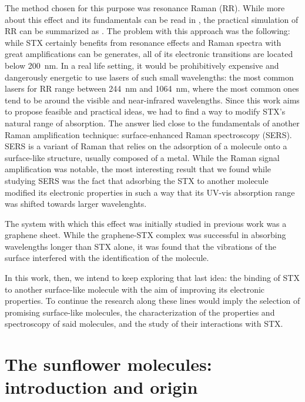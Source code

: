 The method chosen for this purpose was resonance Raman (RR).
While more about this effect and its fundamentals can be read in , the practical simulation of RR can be summarized as .
The problem with this approach was the following: while STX certainly benefits from resonance effects and Raman spectra with great amplifications can be generates, all of its electronic transitions are located below \SI{200}{\nano\metre}.
In a real life setting, it would be prohibitively expensive and dangerously energetic to use lasers of such small wavelengths: the most common lasers for RR range between \SI{244}{\nano\metre} and \SI{1064}{\nano\metre}, where the most common ones tend to be around the visible and near-infrared wavelengths.\cite{karlsson18,horiba}
Since this work aims to propose feasible and practical ideas, we had to find a way to modify STX's natural range of absorption.
The answer lied close to the fundamentals of another Raman amplification technique: surface-enhanced Raman spectroscopy (SERS).
SERS is a variant of Raman that relies on the adsorption of a molecule onto a surface-like structure, usually composed of a metal.
While the Raman signal amplification was notable, the most interesting result that we found while studying SERS was the fact that adsorbing the STX to another molecule modified its electronic properties in such a way that its UV-vis absorption range was shifted towards larger wavelenghts.

The system with which this effect was initially studied in previous work was a graphene sheet.
While the graphene-STX complex was successful in absorbing wavelengths longer than STX alone, it was found that the vibrations of the surface interfered with the identification of the molecule.

In this work, then, we intend to keep exploring that last idea: the binding of STX to another surface-like molecule with the aim of improving its electronic properties.
To continue the research along these lines would imply the selection of promising surface-like molecules, the characterization of the properties and spectroscopy of said molecules, and the study of their interactions with STX.


\section{The sunflower molecules: introduction and origin}

